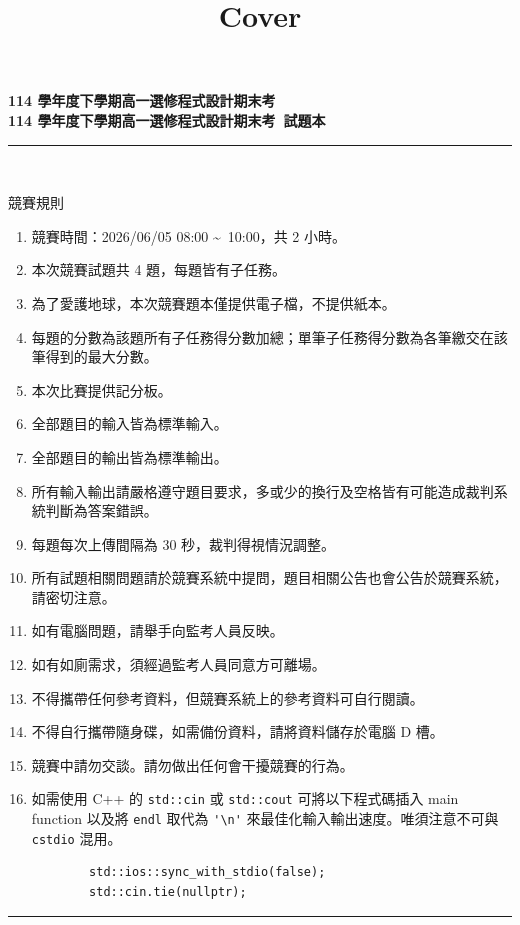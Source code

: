 \documentclass[a4paper]{article}
\title{Cover}
\begin{document}
\begin{center}
\textbf{\huge 114 學年度下學期高一選修程式設計期末考}\\
\vspace{5mm}
\textbf{\huge 114 學年度下學期高一選修程式設計期末考\ 試題本}\\
\vspace{10mm}
\rule{17cm}{2pt}\\
\vspace{5mm}

\huge 競賽規則\\
\end{center}

\fontsize{14pt}{20pt}\selectfont
\begin{enumerate}
    \setlength\itemsep{0.5pt}
    \item 競賽時間：2026/06/05 08:00 \textasciitilde \, 10:00，共 2 小時。
    \item 本次競賽試題共 4 題，每題皆有子任務。
    \item 為了愛護地球，本次競賽題本僅提供電子檔，不提供紙本。
    \item 每題的分數為該題所有子任務得分數加總；單筆子任務得分數為各筆繳交在該筆得到的最大分數。
    \item 本次比賽提供記分板。
    \item 全部題目的輸入皆為標準輸入。
    \item 全部題目的輸出皆為標準輸出。
    \item 所有輸入輸出請嚴格遵守題目要求，多或少的換行及空格皆有可能造成裁判系統判斷為答案錯誤。
    \item 每題每次上傳間隔為 30 秒，裁判得視情況調整。
    \item 所有試題相關問題請於競賽系統中提問，題目相關公告也會公告於競賽系統，請密切注意。
    \item 如有電腦問題，請舉手向監考人員反映。
    \item 如有如廁需求，須經過監考人員同意方可離場。
    \item 不得攜帶任何參考資料，但競賽系統上的參考資料可自行閱讀。
    \item 不得自行攜帶隨身碟，如需備份資料，請將資料儲存於電腦 D 槽。
    \item 競賽中請勿交談。請勿做出任何會干擾競賽的行為。
    \item 如需使用 C++ 的 \lstinline{std::cin} 或 \lstinline{std::cout} 可將以下程式碼插入 main function 以及將 \lstinline{endl} 取代為 \lstinline{'\n'} 來最佳化輸入輸出速度。唯須注意不可與 \lstinline{cstdio} 混用。
        \begin{lstlisting}
        std::ios::sync_with_stdio(false);
        std::cin.tie(nullptr);
        \end{lstlisting}

\end{enumerate}

\begin{center}
\rule{17cm}{2pt}\\
\end{center}
\end{document}
